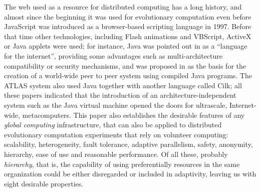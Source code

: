 \documentclass[journal,onecolumn]{IEEEtran}
\begin{document}
The web used as a resource for distributed computing has a
long history, and almost since the beginning it was used for
evolutionary computation even before JavaScript was
introduced as a browser-based scripting language in 1997. Before that
time other technologies,
 including Flash animations and VBScript, ActiveX or Java applets were
used; for instance, Java was pointed out in \cite{soares1998get} as a
``language for the
internet'', providing some advantages such as multi-architecture compatibility or
security mechanisms, and was proposed in \cite{chandy1996world} as the
basis for the creation of a world-wide peer to peer system using compiled Java
programs. The ATLAS system
\cite{Baldeschwieler:1996:TIG:504450.504482} also used Java together
with another language called Cilk; all these papers indicated that
the introduction of an architecture-independent system such as the
Java virtual machine opened the doors for ultrascale, Internet-wide,
metacomputers. This paper also establishes the desirable features of
any {\em global computing} infrastructure, that can also be applied to
distributed evolutionary computation experiments that rely on
volunteer computing: scalability, heterogeneity, fault tolerance,
adaptive parallelism, safety, anonymity, hierarchy, ease of use and
reasonable performance. Of all these, probably {\em hierarchy}, that
is, the capability of using preferentially resources in the same
organization could be either disregarded or included in adaptivity,
leaving us with eight desirable properties.
\end{document}
